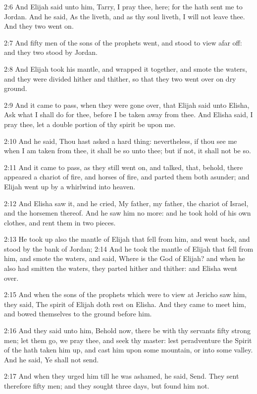 2:6 And Elijah said unto him, Tarry, I pray thee, here; for the \LORD hath sent me to Jordan. And he said, As the \LORD liveth, and as thy soul liveth, I will not leave thee. And they two went on.

2:7 And fifty men of the sons of the prophets went, and stood to view afar off: and they two stood by Jordan.

2:8 And Elijah took his mantle, and wrapped it together, and smote the waters, and they were divided hither and thither, so that they two went over on dry ground.

2:9 And it came to pass, when they were gone over, that Elijah said unto Elisha, Ask what I shall do for thee, before I be taken away from thee. And Elisha said, I pray thee, let a double portion of thy spirit be upon me.

2:10 And he said, Thou hast asked a hard thing: nevertheless, if thou see me when I am taken from thee, it shall be so unto thee; but if not, it shall not be so.

2:11 And it came to pass, as they still went on, and talked, that, behold, there appeared a chariot of fire, and horses of fire, and parted them both asunder; and Elijah went up by a whirlwind into heaven.

2:12 And Elisha saw it, and he cried, My father, my father, the chariot of Israel, and the horsemen thereof. And he saw him no more: and he took hold of his own clothes, and rent them in two pieces.

2:13 He took up also the mantle of Elijah that fell from him, and went back, and stood by the bank of Jordan; 2:14 And he took the mantle of Elijah that fell from him, and smote the waters, and said, Where is the \LORD God of Elijah? and when he also had smitten the waters, they parted hither and thither: and Elisha went over.

2:15 And when the sons of the prophets which were to view at Jericho saw him, they said, The spirit of Elijah doth rest on Elisha. And they came to meet him, and bowed themselves to the ground before him.

2:16 And they said unto him, Behold now, there be with thy servants fifty strong men; let them go, we pray thee, and seek thy master: lest peradventure the Spirit of the \LORD hath taken him up, and cast him upon some mountain, or into some valley. And he said, Ye shall not send.

2:17 And when they urged him till he was ashamed, he said, Send. They sent therefore fifty men; and they sought three days, but found him not.

